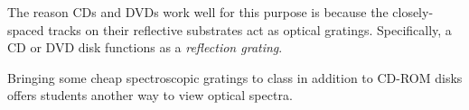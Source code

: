 







The reason CDs and DVDs work well for this purpose is because the closely-spaced tracks on their reflective substrates act as optical gratings.  Specifically, a CD or DVD disk functions as a {\it reflection grating}.

\vskip 10pt

Bringing some cheap spectroscopic gratings to class in addition to CD-ROM disks offers students another way to view optical spectra.




